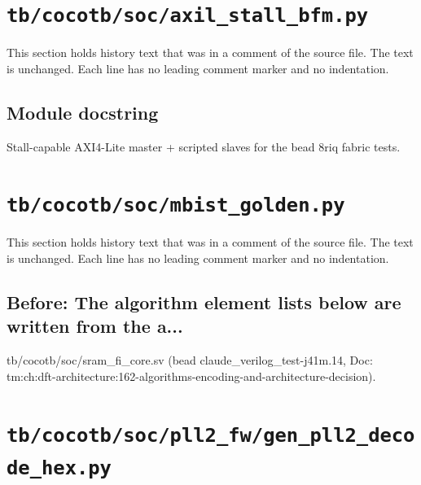 \section{\texttt{tb/cocotb/soc/axil\_stall\_bfm.py}}\label{cr:suite:soc-axil-stall-bfm}

This section holds history text that was in a comment of the source file. The text is unchanged. Each line has no leading comment marker and no indentation.

\begin{record}

\subsection*{Module docstring}

\begin{textblock}
Stall-capable AXI4-Lite master + scripted slaves for the bead 8riq fabric tests.
\end{textblock}

\end{record}

\section{\texttt{tb/cocotb/soc/mbist\_golden.py}}\label{cr:suite:soc-mbist-golden}

This section holds history text that was in a comment of the source file. The text is unchanged. Each line has no leading comment marker and no indentation.

\begin{record}

\subsection*{Before: The algorithm element lists below are written from the a...}

\begin{textblock}
tb/cocotb/soc/sram_fi_core.sv (bead claude_verilog_test-j41m.14, Doc: tm:ch:dft-architecture:162-algorithms-encoding-and-architecture-decision).
\end{textblock}

\end{record}

\section{\texttt{tb/cocotb/soc/pll2\_fw/gen\_pll2\_decode\_hex.py}}\label{cr:suite:soc-pll2-fw-gen-pll2-decode-hex}

